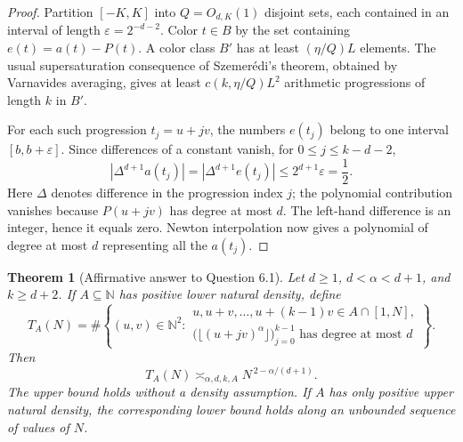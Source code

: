 \documentclass[11pt,a4paper]{article}
\newtheorem{theorem}{Theorem}[section]
\theoremstyle{definition}
\theoremstyle{remark}
\numberwithin{equation}{section}
\begin{document}
\begin{proof}
Partition $[-K,K]$ into $Q=O_{d,K}(1)$ disjoint sets, each contained in
an interval of length $\varepsilon=2^{-d-2}$. Color $t\in B$ by the set
containing $e(t)=a(t)-P(t)$. A color class $B'$ has at least
$(\eta/Q)L$ elements. The usual supersaturation consequence of
Szemer\'edi's theorem, obtained by Varnavides averaging, gives at least
$c(k,\eta/Q)L^2$ arithmetic progressions of length $k$ in $B'$.

For each such progression $t_j=u+jv$, the numbers $e(t_j)$ belong to
one interval $[b,b+\varepsilon]$. Since differences of a constant
vanish, for $0\leq j\leq k-d-2$,
\[
 \left|\Delta^{d+1}a(t_j)\right|
 =\left|\Delta^{d+1}e(t_j)\right|
 \leq 2^{d+1}\varepsilon=\frac12.
\]
Here $\Delta$ denotes difference in the progression index $j$; the
polynomial contribution vanishes because $P(u+jv)$ has degree at most
$d$. The left-hand difference is an integer, hence it equals zero.
Newton interpolation now gives a polynomial of degree at most $d$
representing all the $a(t_j)$.
\end{proof}

\begin{theorem}[Affirmative answer to Question 6.1]\label{sur:thm:ps-density}
Let $d\geq1$, $d<\alpha<d+1$, and $k\geq d+2$. If
$A\subseteq\mathbb N$ has positive lower natural density, define
\[
 T_A(N)=\#\left\{(u,v)\in\mathbb N^2:
 \begin{array}{l}
 u,u+v,\ldots,u+(k-1)v\in A\cap[1,N],\\
 \bigl(\lfloor(u+jv)^\alpha\rfloor\bigr)_{j=0}^{k-1}
 \text{ has degree at most }d
 \end{array}\right\}.
\]
Then
\[
 T_A(N)\asymp_{\alpha,d,k,A}N^{\,2-\alpha/(d+1)}.
\]
The upper bound holds without a density assumption. If $A$ has only
positive upper natural density, the corresponding lower bound holds
along an unbounded sequence of values of $N$.
\end{theorem}
\end{document}
